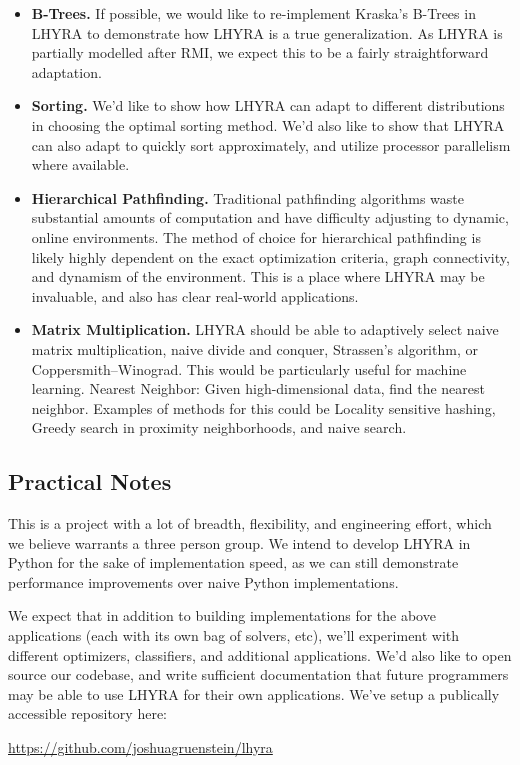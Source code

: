 \documentclass{article}
\begin{document}
\begin{itemize}
	\item \textbf{B-Trees.} If possible, we would like to re-implement Kraska’s B-Trees in LHYRA to demonstrate how LHYRA is a true generalization. As LHYRA is partially modelled after RMI, we expect this to be a fairly straightforward adaptation.
	\item \textbf{Sorting.} We’d like to show how LHYRA can adapt to different distributions in choosing the optimal sorting method. We’d also like to show that LHYRA can also adapt to quickly sort approximately, and utilize processor parallelism where available.
	\item \textbf{Hierarchical Pathfinding.} Traditional pathfinding algorithms waste substantial amounts of computation and have difficulty adjusting to dynamic, online environments. The method of choice for hierarchical pathfinding is likely highly dependent on the exact optimization criteria, graph connectivity, and dynamism of the environment. This is a place where LHYRA may be invaluable, and also has clear real-world applications.
	\item \textbf{Matrix Multiplication.} LHYRA should be able to adaptively select naive matrix multiplication, naive divide and conquer, Strassen’s algorithm, or Coppersmith–Winograd. This would be particularly useful for machine learning.
	Nearest Neighbor: Given high-dimensional data, find the nearest neighbor. Examples of methods for this could be Locality sensitive hashing, Greedy search in proximity neighborhoods, and naive search.

\end{itemize}

\subsection*{Practical Notes}

This is a project with a lot of breadth, flexibility, and engineering effort, which we believe warrants a three person group. We intend to develop LHYRA in Python for the sake of implementation speed, as we can still demonstrate performance improvements over naive Python implementations.

We expect that in addition to building implementations for the above applications (each with its own bag of solvers, etc), we’ll experiment with different optimizers, classifiers, and additional applications. We’d also like to open source our codebase, and write sufficient documentation that future programmers may be able to use LHYRA for their own applications. We've setup a publically accessible repository here:

\begin{center}
\url{https://github.com/joshuagruenstein/lhyra}
\end{center}
\end{document}
